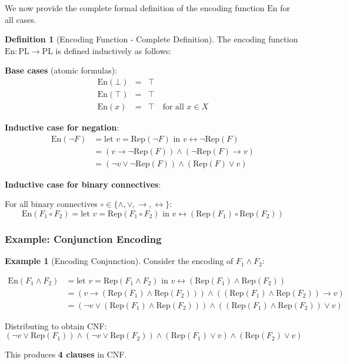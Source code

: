 \documentclass[11pt,a4paper]{article}
\theoremstyle{definition}
\newtheorem{definition}{Definition}[section]
\newtheorem{example}{Example}[section]
\theoremstyle{plain}
\theoremstyle{remark}
\begin{document}
We now provide the complete formal definition of the encoding function $\text{En}$ for all cases.

\begin{definition}[Encoding Function - Complete Definition]
The encoding function $\text{En}: \text{PL} \rightarrow \text{PL}$ is defined inductively as follows:

\textbf{Base cases} (atomic formulas):
\[
\begin{array}{lcl}
\text{En}(\bot) &=& \top \\
\text{En}(\top) &=& \top \\
\text{En}(x) &=& \top \quad \text{for all } x \in X
\end{array}
\]

\textbf{Inductive case for negation}:
\begin{align*}
\text{En}(\neg F) &= \text{let } v = \text{Rep}(\neg F) \text{ in } v \leftrightarrow \neg \text{Rep}(F) \\
&= (v \rightarrow \neg \text{Rep}(F)) \land (\neg \text{Rep}(F) \rightarrow v) \\
&= (\neg v \lor \neg \text{Rep}(F)) \land (\text{Rep}(F) \lor v)
\end{align*}

\textbf{Inductive case for binary connectives}:

For all binary connectives $\circ \in \{\land, \lor, \rightarrow, \leftrightarrow\}$:
\[
\text{En}(F_1 \circ F_2) = \text{let } v = \text{Rep}(F_1 \circ F_2) \text{ in } v \leftrightarrow (\text{Rep}(F_1) \circ \text{Rep}(F_2))
\]
\end{definition}

\subsubsection{Example: Conjunction Encoding}

\begin{example}[Encoding Conjunction]
Consider the encoding of $F_1 \land F_2$:

\begin{align*}
\text{En}(F_1 \land F_2) &= \text{let } v = \text{Rep}(F_1 \land F_2) \text{ in } v \leftrightarrow (\text{Rep}(F_1) \land \text{Rep}(F_2)) \\
&= (v \rightarrow (\text{Rep}(F_1) \land \text{Rep}(F_2))) \land ((\text{Rep}(F_1) \land \text{Rep}(F_2)) \rightarrow v) \\
&= (\neg v \lor (\text{Rep}(F_1) \land \text{Rep}(F_2))) \land ((\text{Rep}(F_1) \land \text{Rep}(F_2)) \lor v)
\end{align*}

Distributing to obtain CNF:
\[
(\neg v \lor \text{Rep}(F_1)) \land (\neg v \lor \text{Rep}(F_2)) \land (\text{Rep}(F_1) \lor v) \land (\text{Rep}(F_2) \lor v)
\]

This produces \textbf{4 clauses} in CNF.
\end{example}
\end{document}
